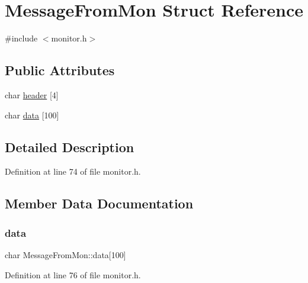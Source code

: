 \hypertarget{struct_message_from_mon}{}\section{Message\+From\+Mon Struct Reference}
\label{struct_message_from_mon}


{\ttfamily \#include $<$monitor.\+h$>$}

\subsection*{Public Attributes}
\begin{DoxyCompactItemize}
\item 
char \hyperlink{struct_message_from_mon_ad46f6e6dd24be5cb2bc5eae5b3cdd095}{header} \mbox{[}4\mbox{]}
\item 
char \hyperlink{struct_message_from_mon_a1aea445500b0fa020a1b08eaff791107}{data} \mbox{[}100\mbox{]}
\end{DoxyCompactItemize}


\subsection{Detailed Description}


Definition at line 74 of file monitor.\+h.



\subsection{Member Data Documentation}
\mbox{\label{struct_message_from_mon_a1aea445500b0fa020a1b08eaff791107}} 
\subsubsection{\texorpdfstring{data}{data}}
{\footnotesize\ttfamily char Message\+From\+Mon\+::data\mbox{[}100\mbox{]}}



Definition at line 76 of file monitor.\+h.

\mbox{\label{struct_message_from_mon_ad46f6e6dd24be5cb2bc5eae5b3cdd095}} 

